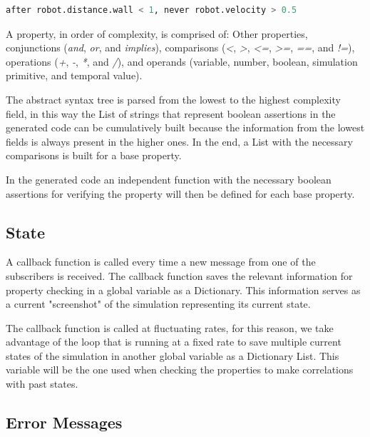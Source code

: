\begin{lstlisting}[language=Python]
    after robot.distance.wall < 1, never robot.velocity > 0.5
\end{lstlisting}\label{lstlisting:compileEx}

A property, in order of complexity, is comprised of: Other properties, conjunctions (\textit{and}, \textit{or}, and \textit{implies}), comparisons (\textit{<}, \textit{>}, \textit{<=}, \textit{>=}, \textit{==}, and \textit{!=}), operations (\textit{+}, \textit{-}, \textit{*}, and \textit{/}), and operands (variable, number, boolean, simulation primitive, and temporal value). 

The abstract syntax tree is parsed from the lowest to the highest complexity field, in this way the List of strings that represent boolean assertions in the generated code can be cumulatively built because the information from the lowest fields is always present in the higher ones. In the end, a List with the necessary comparisons is built for a base property.


In the generated code an independent function with the necessary boolean assertions for verifying the property will then be defined for each base property.


\subsection{State}
\label{ssec:compileState}

A callback function is called every time a new message from one of the subscribers is received. The callback function saves the relevant information for property checking in a global variable as a Dictionary. This information serves as a current "screenshot" of the simulation representing its current state.

The callback function is called at fluctuating rates, for this reason, we take advantage of the loop that is running at a fixed rate to save multiple current states of the simulation in another global variable as a Dictionary List. This variable will be the one used when checking the properties to make correlations with past states.


\subsection{Error Messages}
\label{ssec:errormessages}

